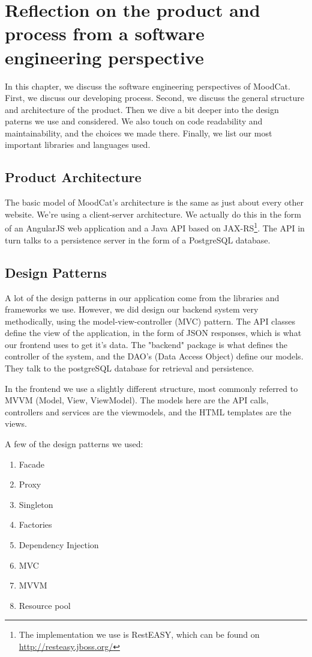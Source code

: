 \chapter{Reflection on the product and process from a software engineering perspective}
In this chapter, we discuss the software engineering perspectives of MoodCat. First, we discuss our developing process. Second, we discuss the general structure and architecture of the product. Then we dive a bit deeper into the design paterns we use and considered. We also touch on code readability and maintainability, and the choices we made there. Finally, we list our most important libraries and languages used.

\section{Product Architecture}
The basic model of MoodCat's architecture is the same as just about every other website.
We're using a client-server architecture.
We actually do this in the form of an AngularJS web application and a Java API based on JAX-RS\footnote{The implementation we use is RestEASY, which can be found on \url{http://resteasy.jboss.org/}}. 
The API in turn talks to a persistence server in the form of a PostgreSQL database.

\section{Design Patterns}
A lot of the design patterns in our application come from the libraries and frameworks we use. However, we did design our backend system very methodically, using the model-view-controller (MVC) pattern. The API classes define the view of the application, in the form of JSON responses, which is what our frontend uses to get it's data. The "backend" package is what defines the controller of the system, and the DAO's (Data Access Object) define our models. They talk to the postgreSQL database for retrieval and persistence.

In the frontend we use a slightly different structure, most commonly referred to MVVM (Model, View, ViewModel). The models here are the API calls, controllers and services are the viewmodels, and the HTML templates are the views.

A few of the design patterns we used:
\begin{enumerate}
\item Facade
\item Proxy
\item Singleton
\item Factories
\item Dependency Injection
\item MVC
\item MVVM
\item Resource pool
\end{enumerate}

